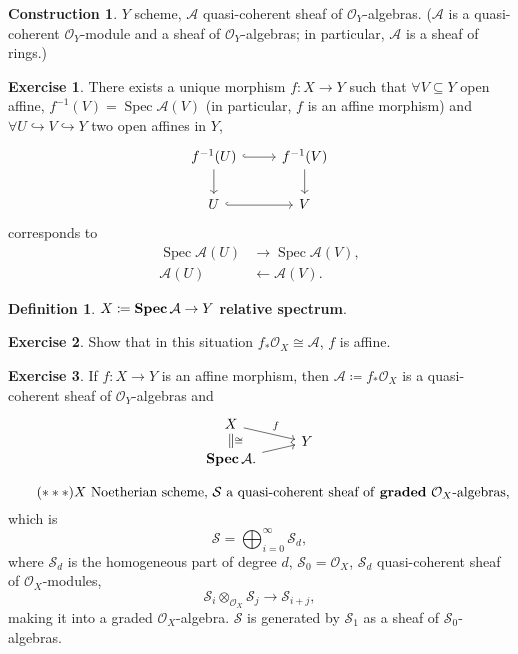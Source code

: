 \documentclass[12pt]{article}
\DeclareMathOperator{\Spec}{Spec}
\DeclareMathOperator{\relSpec}{\textnormal{\textbf{Spec}}}
\theoremstyle{definition}
\newtheorem*{definition}{Definition}
\newtheorem*{exercise}{Exercise}
\newtheorem*{construction}{Construction}
\begin{document}
\begin{construction}
$Y$ scheme, $\mathcal{A}$ quasi-coherent sheaf of $\mathcal{O}_Y$-algebras. ($\mathcal{A}$ is a quasi-coherent $\mathcal{O}_Y$-module and a sheaf of $\mathcal{O}_Y$-algebras; in particular, $\mathcal{A}$ is a sheaf of rings.)

\begin{exercise}
There exists a unique morphism $f:X\rightarrow Y$ such that $\forall V\subseteq Y$ open affine, $f^{-1}(V)=\Spec\mathcal{A}(V)$ (in particular, $f$ is an affine morphism) and $\forall U\hookrightarrow V\hookrightarrow Y$ two open affines in $Y$,
\[
\begin{tikzcd}
f^{-1}(U)\arrow[r,hook]\arrow[d]&f^{-1}(V)\arrow[d]\\
U\arrow[r,hook]&V
\end{tikzcd}
\]
corresponds to
\begin{align*}
\Spec\mathcal{A}(U)&\longrightarrow\Spec\mathcal{A}(V),\\
\mathcal{A}(U)&\longleftarrow\mathcal{A}(V).
\end{align*}
\end{exercise}

\begin{definition}
$X\coloneqq\relSpec\mathcal{A}\rightarrow Y$ \textbf{relative spectrum}.
\end{definition}

\begin{exercise}
Show that in this situation $f_*\mathcal{O}_X\cong\mathcal{A}$, $f$ is affine.
\end{exercise}

\begin{exercise}
If $f:X\rightarrow Y$ is an affine morphism, then $\mathcal{A}\coloneqq f_*\mathcal{O}_X$ is a quasi-coherent sheaf of $\mathcal{O}_Y$-algebras and
\[
\begin{tikzcd}
X\arrow[rd,"f"]\arrow[dd,-,double equal sign distance,double,"\cong"]\\[-0.7cm]
&Y\\[-0.7cm]
\relSpec\mathcal{A}.\arrow[ru]
\end{tikzcd}
\]
\end{exercise}
\end{construction}

\begin{equation}\tag{$***$}\label{condition_algebra}
X\text{ Noetherian scheme, }\mathcal{S}\text{ a quasi-coherent sheaf of \textbf{graded} }\mathcal{O}_X\text{-algebras},
\end{equation}
which is
\[\mathcal{S}=\bigoplus_{i=0}^{\infty}\mathcal{S}_d,\]
where $\mathcal{S}_d$ is the homogeneous part of degree $d$, $\mathcal{S}_0=\mathcal{O}_X$, $\mathcal{S}_d$ quasi-coherent sheaf of $\mathcal{O}_X$-modules,
\[\mathcal{S}_i\otimes_{\mathcal{O}_X}\mathcal{S}_j\longrightarrow\mathcal{S}_{i+j},\]
making it into a graded $\mathcal{O}_X$-algebra. $\mathcal{S}$ is generated by $\mathcal{S}_1$ as a sheaf of $\mathcal{S}_0$-algebras.
\end{document}
